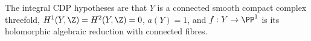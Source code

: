 \begin{definition}
\hypertarget{tag-P201}{}\label{def:II:integral-cdp}

The integral CDP hypotheses are that $Y$ is a connected
smooth compact complex threefold, $H^1(Y,\Z)=H^2(Y,\Z)=0$,
$a(Y)=1$, and $f:Y\to\PP^1$ is its holomorphic algebraic reduction
with connected fibres.
\end{definition}
